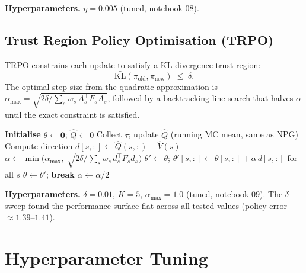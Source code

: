 \documentclass[11pt]{article}
\begin{document}
\textbf{Hyperparameters.}  $\eta=0.005$ (tuned, notebook 08).

\subsection{Trust Region Policy Optimisation (TRPO)}

TRPO constrains each update to satisfy a KL-divergence trust region:
\[
    \bar{\text{KL}}(\pi_{\text{old}},\pi_{\text{new}}) \;\leq\; \delta.
\]
The optimal step size from the quadratic approximation is
$\alpha_{\max} = \sqrt{2\delta / \sum_s w_s\,A_s^\top F_s A_s}$,
followed by a backtracking line search that halves $\alpha$ until the exact
constraint is satisfied.

\begin{algorithm}[H]
\caption{TRPO (tabular)}
\label{alg:trpo}
\begin{algorithmic}[1]
\State \textbf{Initialise} $\theta\leftarrow\mathbf{0}$;\; $\hat{Q}\leftarrow 0$
    \State Collect $\tau$;\; update $\hat{Q}$ (running MC mean, same as NPG)
    \State Compute direction $d[s,:] \leftarrow \hat{Q}(s,:) - \hat{V}(s)$
    \State $\alpha \leftarrow \min\!\bigl(\alpha_{\max},\;\sqrt{2\delta / \sum_s w_s\,d_s^\top F_s d_s}\bigr)$
     
        \State $\theta' \leftarrow \theta$;\;
               $\theta'[s,:] \leftarrow \theta[s,:] + \alpha\,d[s,:]$ for all $s$
            \State $\theta \leftarrow \theta'$;\; \textbf{break}
        \EndIf
        \State $\alpha \leftarrow \alpha / 2$
    \EndFor
\EndFor
\end{algorithmic}
\end{algorithm}

\textbf{Hyperparameters.}  $\delta=0.01$, $K=5$, $\alpha_{\max}=1.0$
(tuned, notebook 09).  The $\delta$ sweep found the performance surface flat
across all tested values (policy error $\approx 1.39$--$1.41$).

\section{Hyperparameter Tuning}
\label{sec:tuning}
\end{document}
